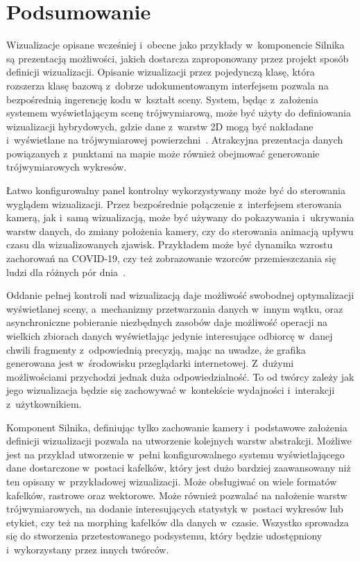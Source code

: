 \section{Podsumowanie}

Wizualizacje opisane wcześniej i~obecne jako przykłady w~komponencie Silnika są prezentacją możliwości, jakich dostarcza zaproponowany przez projekt sposób definicji wizualizacji. Opisanie wizualizacji przez pojedynczą klasę, która rozszerza klasę bazową z~dobrze udokumentowanym interfejsem pozwala na bezpośrednią ingerencję kodu w~kształt sceny. System, będąc z~założenia systemem wyświetlającym scenę trójwymiarową, może być użyty do definiowania wizualizacji hybrydowych, gdzie dane z~warstw 2D mogą być nakładane i~wyświetlane na trójwymiarowej powierzchni~\cite{Hybrid}. Atrakcyjna prezentacja danych powiązanych z~punktami na mapie może również obejmować generowanie trójwymiarowych wykresów.

Łatwo konfigurowalny panel kontrolny wykorzystywany może być do sterowania wyglądem wizualizacji. Przez bezpośrednie połączenie z~interfejsem sterowania kamerą, jak i~samą wizualizacją, może być używany do pokazywania i~ukrywania warstw danych, do zmiany położenia kamery, czy do sterowania animacją upływu czasu dla wizualizowanych zjawisk. Przykładem może być dynamika wzrostu zachorowań na COVID-19, czy też zobrazowanie wzorców przemieszczania się ludzi dla różnych pór dnia~\cite{Kwan}.

Oddanie pełnej kontroli nad wizualizacją daje możliwość swobodnej optymalizacji wyświetlanej sceny, a~mechanizmy przetwarzania danych w~innym wątku, oraz asynchroniczne pobieranie niezbędnych zasobów daje możliwość operacji na wielkich zbiorach danych wyświetlając jedynie interesujące odbiorcę w~danej chwili fragmenty z~odpowiednią precyzją, mając na uwadze, że grafika generowana jest w~środowisku przeglądarki internetowej. Z~dużymi możliwościami przychodzi jednak duża odpowiedzialność. To od twórcy zależy jak jego wizualizacja będzie się zachowywać w~kontekście wydajności i~interakcji z~użytkownikiem.

Komponent Silnika, definiując tylko zachowanie kamery i~podstawowe założenia definicji wizualizacji pozwala na utworzenie kolejnych warstw abstrakcji. Możliwe jest na przykład utworzenie w~pełni konfigurowalnego systemu wyświetlającego dane dostarczone w~postaci kafelków, który jest dużo bardziej zaawansowany niż ten opisany w~przykładowej wizualizacji. Może obsługiwać on wiele formatów kafelków, rastrowe oraz wektorowe. Może również pozwalać na nałożenie warstw trójwymiarowych, na dodanie interesujących statystyk w~postaci wykresów lub etykiet, czy też na morphing kafelków dla danych w~czasie. Wszystko sprowadza się do stworzenia przetestowanego podsystemu, który będzie udostępniony i~wykorzystany przez innych twórców. 